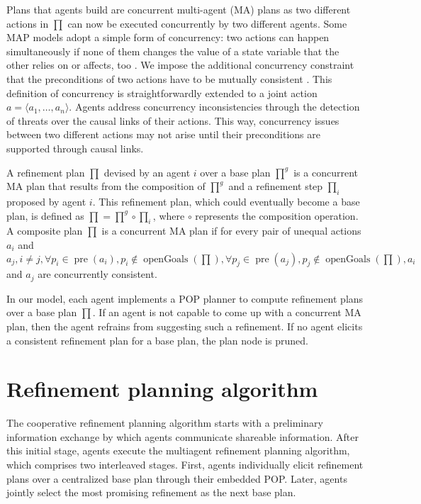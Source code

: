 \documentclass[12pt]{article}
\DeclareMathOperator{\pre}{pre}
\DeclareMathOperator{\openGoals}{openGoals}
\begin{document}
Plans that agents build are concurrent multi-agent (MA) plans as two different actions in $\prod$ can now be executed concurrently by two different agents.
Some MAP models adopt a simple form of concurrency: two actions can happen simultaneously if none of them changes the value of a state variable that the other relies on or affects, too \cite{Brenner2009}.
We impose the additional concurrency constraint that the preconditions of two actions have to be mutually consistent \cite{Boutilier_2001}.
This definition of concurrency is straightforwardly extended to a joint action $a = \langle a_1,\ldots, a_n\rangle$.
Agents address concurrency inconsistencies through the detection of threats over the causal links of their actions.
This way, concurrency issues between two different actions may not arise until their preconditions are supported through causal links.

A refinement plan $\prod$ devised by an agent $i$ over a base plan $\prod^g$ is a concurrent MA plan that results from the composition of $\prod^g$ and a refinement step $\prod_i$ proposed by agent $i$.
This refinement plan, which could eventually become a base plan, is defined as $\prod = \prod^g \circ \prod_i$, where $\circ$ represents the composition operation.
A composite plan $\prod$ is a concurrent MA plan if for every pair of unequal actions $a_i$ and $a_j, i \neq j, \forall p_i \in \pre(a_i), p_i \notin \openGoals(\prod), \forall p_j \in \pre(a_j), p_j \notin \openGoals(\prod), a_i$ and $a_j$ are concurrently consistent.

In our model, each agent implements a POP planner to compute refinement plans over a base plan $\prod$.
If an agent is not capable to come up with a concurrent MA plan, then the agent refrains from suggesting such a refinement.
If no agent elicits a consistent refinement plan for a base plan, the plan node is pruned.

\section{Refinement planning algorithm}

The cooperative refinement planning algorithm starts with a preliminary information exchange by which agents communicate shareable information.
After this initial stage, agents execute the multiagent refinement planning algorithm, which comprises two interleaved stages.
First, agents individually elicit refinement plans over a centralized base plan through their embedded POP.
Later, agents jointly select the most promising refinement as the next base plan.
\end{document}
